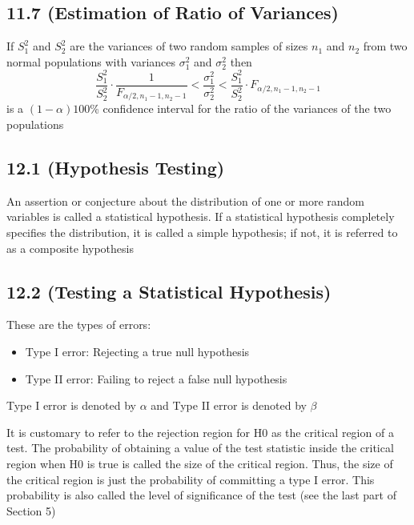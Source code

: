 \documentclass[answers,12pt,addpoints]{exam}
\begin{document}
\subsection{11.7 (Estimation of Ratio of Variances)}
\begin{definition}
    If $S_1^2$ and $S_2^2$ are the variances of two random samples of sizes $n_1$ and $n_2$ from two normal populations with variances $\sigma_1^2$ and $\sigma_2^2$ then
    $$ \frac{S_1^2}{S_2^2} \cdot \frac{1}{F_{\alpha/2, n_1 - 1, n_2 - 1}} < \frac{\sigma_1^2}{\sigma_2^2} < \frac{S_1^2}{S_2^2} \cdot F_{\alpha/2, n_1 - 1, n_2 - 1}$$
    is a $(1-\alpha)100$\% confidence interval for the ratio of the variances of the two populations
    
\end{definition}
\subsection{12.1 (Hypothesis Testing)}
\begin{definition}
    An assertion or conjecture about the distribution of one or more random variables is called a statistical hypothesis. If
a statistical hypothesis completely specifies the distribution, it is called a simple
hypothesis; if not, it is referred to as a composite hypothesis
\end{definition}
\subsection{12.2 (Testing a Statistical Hypothesis)}
\begin{definition}
    These are the types of errors:\\
    \begin{itemize}
        \item Type I error: Rejecting a true null hypothesis
        \item Type II error: Failing to reject a false null hypothesis
    \end{itemize}
    Type I error is denoted by $\alpha$ and Type II error is denoted by $\beta$
\end{definition}
\begin{definition}
    It is customary to refer to the rejection region for
H0 as the critical region of a test. The probability of obtaining a value of the test
statistic inside the critical region when H0 is true is called the size of the critical
region. Thus, the size of the critical region is just the probability  of committing
a type I error. This probability is also called the level of significance of the test
(see the last part of Section 5)
\end{definition}
\end{document}
